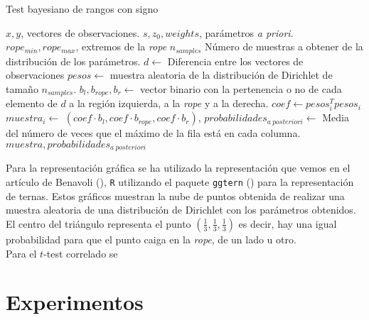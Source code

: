 \begin{algorithm}[H]
	\caption{Test bayesiano de rangos con signo}
	\label{alg:TBRS}
	\begin{algorithmic}[1]
	\REQUIRE $x, y$, vectores de observaciones.
	\REQUIRE $s, z_0, weights$, parámetros \textit{a priori}.
	\REQUIRE $rope_{min}, rope_{max}$, extremos de la \textit{rope}
	\REQUIRE $n_{samples}$ Número de muestras a obtener de
		la distribución de los parámetros.
	\STATE $d \leftarrow$ Diferencia entre los vectores 
		de observaciones 
	\STATE $pesos \leftarrow$ muestra aleatoria de 
		la distribución de Dirichlet de tamaño $n_{samples}$.
	\STATE $b_l, b_{rope}, b_r \leftarrow$ vector binario con
		la pertenencia o no de cada elemento de $d$ a la 
		región izquierda, a la \textit{rope} y a la derecha.
		\STATE $coef \leftarrow pesos_i^T pesos_i$
		\STATE $muestra_i \leftarrow$
			$(coef \cdot b_l, coef \cdot b_{rope}, 
			coef \cdot b_r)$,  
	\ENDFOR
	\STATE $probabilidades_{a\ posteriori} \leftarrow $
		Media del número de veces que el máximo de la fila 
		está en cada columna.
	\RETURN $muestra, probabilidades_{a\ posteriori}$
	\end{algorithmic}
\end{algorithm} 


Para la representación gráfica se ha utilizado
la representación que vemos en el artículo
de Benavoli (\cite{DBLP:journals/corr/BenavoliCDZ16}),
\texttt{R} utilizando el paquete \texttt{ggtern} (\cite{ggtern})
para la representación de ternas. Estos gráficos
muestran la nube de puntos obtenida de realizar
una muestra aleatoria de una distribución
de Dirichlet con los parámetros obtenidos.
El centro del triángulo representa el punto
$\left( \frac{1}{3}, \frac{1}{3}, \frac{1}{3} \right)$
es decir, hay una igual probabilidad para que el punto
caiga en la \textit{rope}, de un lado u otro.\\
Para el $t$-test correlado se 



\chapter{Experimentos}
\label{chapter:experimentos}
